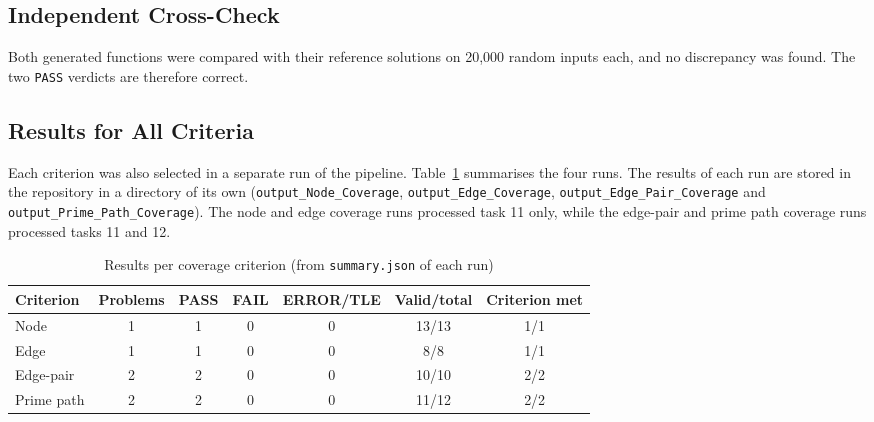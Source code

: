 \documentclass[11pt, a4paper]{article}
\begin{document}
\subsection{Independent Cross-Check}

Both generated functions were compared with their reference solutions on 20,000 random inputs each, and no discrepancy was found. The two \texttt{PASS} verdicts are therefore correct.


\subsection{Results for All Criteria}

Each criterion was also selected in a separate run of the pipeline. Table~\ref{tab:allcriteria} summarises the four runs. The results of each run are stored in the repository in a directory of its own (\texttt{output\_Node\_Coverage}, \texttt{output\_Edge\_Coverage}, \texttt{output\_Edge\_Pair\_Coverage} and \texttt{output\_Prime\_Path\_Coverage}). The node and edge coverage runs processed task 11 only, while the edge-pair and prime path coverage runs processed tasks 11 and 12.

\begin{table}[H]
    \centering
    \small
    \begin{tabular}{lcccccc}
        \toprule
        \textbf{Criterion} & \textbf{Problems} & \textbf{PASS} & \textbf{FAIL} & \textbf{ERROR/TLE} & \textbf{Valid/total} & \textbf{Criterion met} \\
        \midrule
        Node & 1 & 1 & 0 & 0 & 13/13 & 1/1 \\
        Edge & 1 & 1 & 0 & 0 & 8/8 & 1/1 \\
        Edge-pair & 2 & 2 & 0 & 0 & 10/10 & 2/2 \\
        Prime path & 2 & 2 & 0 & 0 & 11/12 & 2/2 \\
        \bottomrule
    \end{tabular}
    \caption{Results per coverage criterion (from \texttt{summary.json} of each run)}
    \label{tab:allcriteria}
\end{table}
\end{document}
